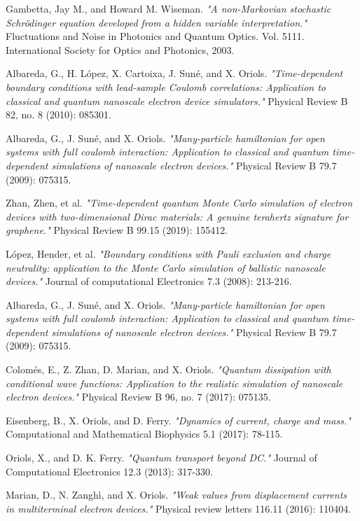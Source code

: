 \documentclass[11pt, a4paper]{article} %
\begin{document}
\begin{thebibliography}{1}
{
Gambetta, Jay M., and Howard M. Wiseman. {\em "A non-Markovian stochastic Schrödinger equation developed from a hidden variable interpretation."} Fluctuations and Noise in Photonics and Quantum Optics. Vol. 5111. International Society for Optics and Photonics, 2003.

Albareda, G., H. López, X. Cartoixa, J. Suné, and X. Oriols. {\em "Time-dependent boundary conditions with lead-sample Coulomb correlations: Application to classical and quantum nanoscale electron device simulators."} Physical Review B 82, no. 8 (2010): 085301.

Albareda, G., J. Suné, and X. Oriols. {\em "Many-particle hamiltonian for open systems with full coulomb interaction: Application to classical and quantum time-dependent simulations of nanoscale electron devices."} Physical Review B 79.7 (2009): 075315.

Zhan, Zhen, et al. {\em "Time-dependent quantum Monte Carlo simulation of electron devices with two-dimensional Dirac materials: A genuine terahertz signature for graphene."} Physical Review B 99.15 (2019): 155412.

López, Hender, et al. {\em "Boundary conditions with Pauli exclusion and charge neutrality: application to the Monte Carlo simulation of ballistic nanoscale devices."} Journal of computational Electronics 7.3 (2008): 213-216.

Albareda, G., J. Suné, and X. Oriols. {\em "Many-particle hamiltonian for open systems with full coulomb interaction: Application to classical and quantum time-dependent simulations of nanoscale electron devices."} Physical Review B 79.7 (2009): 075315.

Colomés, E., Z. Zhan, D. Marian, and X. Oriols. {\em "Quantum dissipation with conditional wave functions: Application to the realistic simulation of nanoscale electron devices."} Physical Review B 96, no. 7 (2017): 075135.

Eisenberg, B., X. Oriols, and D. Ferry. {\em "Dynamics of current, charge and mass."} Computational and Mathematical Biophysics 5.1 (2017): 78-115.

Oriols, X., and D. K. Ferry. {\em "Quantum transport beyond DC."} Journal of Computational Electronics 12.3 (2013): 317-330.

Marian, D., N. Zanghì, and X. Oriols. {\em "Weak values from displacement currents in multiterminal electron devices."} Physical review letters 116.11 (2016): 110404.

}
\end{thebibliography}
\end{document}
